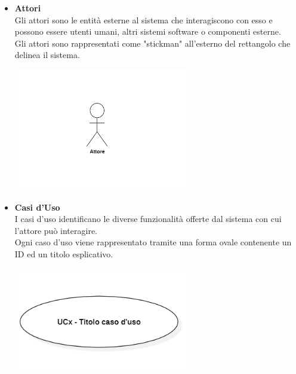 \begin{itemize}
    \item \textbf{Attori} \\
    Gli attori sono le entità esterne al sistema che interagiscono con esso e possono essere utenti umani, altri sistemi software o componenti esterne. \\
    Gli attori sono rappresentati come "stickman" all'esterno del rettangolo che delinea il sistema.
    \begin{minipage}[t]{\linewidth}
        \centering
        \includegraphics[width=0.6\textwidth]{../Images/NormeDiProgetto/Attore.PNG}
    \end{minipage}

    \item \textbf{Casi d'Uso} \\
    I casi d'uso identificano le diverse funzionalità offerte dal sistema con cui l'attore può interagire. \\
    Ogni caso d'uso viene rappresentato tramite una forma ovale contenente un ID ed un titolo esplicativo.
    \begin{minipage}[t]{\linewidth}
        \centering
        \includegraphics[width=0.6\textwidth]{../Images/NormeDiProgetto/UC.PNG}
    \end{minipage}


\end{itemize}

